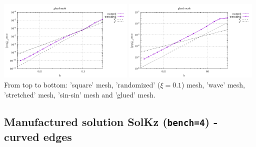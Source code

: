 \begin{center}
\includegraphics[width=6.5cm]{python_codes/fieldstone_76/results/bench4/straight/errors_V_mt6.pdf}
\includegraphics[width=6.5cm]{python_codes/fieldstone_76/results/bench4/straight/errors_P_mt6.pdf}\\
{\captionfont From top to bottom: 'square' mesh, 'randomized' ($\xi=0.1$) mesh,
'wave' mesh, 'stretched' mesh, 'sin-sin' mesh and 'glued' mesh.}
\end{center}

\newpage
\subsection*{Manufactured solution SolKz ({\tt bench=4}) - curved edges}

